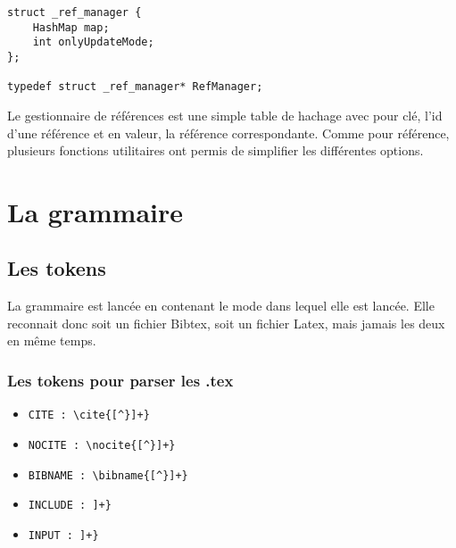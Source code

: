 \documentclass[hidelinks, a4paper,11pt,twoside,final]{article}
\begin{document}
\begin{lstlisting}
struct _ref_manager {
	HashMap map;
	int onlyUpdateMode;
};

typedef struct _ref_manager* RefManager;
\end{lstlisting}

Le gestionnaire de références est une simple table de hachage avec pour clé, l'id d'une référence et en valeur, la référence correspondante.
Comme pour référence, plusieurs fonctions utilitaires ont permis de simplifier les différentes options.

\section{La grammaire}
\subsection{Les tokens}
La grammaire est lancée en contenant le mode dans lequel elle est lancée. Elle reconnait donc soit un fichier Bibtex, 
soit un fichier Latex, mais jamais les deux en même temps.
\subsubsection {Les tokens pour parser les .tex}
\begin{itemize}
 \item \begin{verbatim}CITE : \cite{[^}]+}\end{verbatim}
 
 \item \begin{verbatim}NOCITE : \nocite{[^}]+}\end{verbatim}
 
 \item \begin{verbatim}BIBNAME : \bibname{[^}]+}\end{verbatim}
 
 \item \begin{verbatim}INCLUDE : ]+}\end{verbatim}
 
 \item \begin{verbatim}INPUT : ]+}\end{verbatim}
\end{itemize} 
\end{document}

